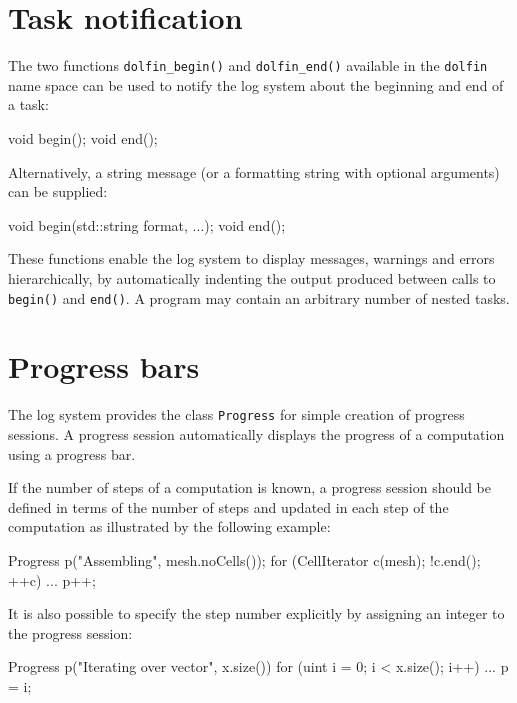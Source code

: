 \section{Task notification}

The two functions \texttt{dolfin\_begin()} and \texttt{dolfin\_end()}
available in the \texttt{dolfin} name space can be used to notify the
\dolfin{} log system about the beginning and end of a task:
\begin{code}
void begin();
void end();
\end{code}
Alternatively, a string message (or a formatting string with optional
arguments) can be supplied:
\begin{code}
void begin(std::string format, ...);
void end();
\end{code}

These functions enable the \dolfin{} log system to display messages,
warnings and errors hierarchically, by automatically indenting the
output produced between calls to \texttt{begin()} and
\texttt{end()}. A program may contain an arbitrary number of nested
tasks.

\section{Progress bars}

The \dolfin{} log system provides the class \texttt{Progress} for
simple creation of progress sessions. A progress session automatically
displays the progress of a computation using a progress bar.

If the number of steps of a computation is known, a progress session
should  be defined in terms of the number of steps and updated in each
step of the computation as illustrated by the following example:
\begin{code}
Progress p("Assembling", mesh.noCells());  
for (CellIterator c(mesh); !c.end(); ++c)
{
  ...
  p++;
}
\end{code}
It is also possible to specify the step number explicitly by assigning
an integer to the progress session:
\begin{code}
Progress p("Iterating over vector", x.size())
for (uint i = 0; i < x.size(); i++)
{
  ...
  p = i;
}
\end{code}

